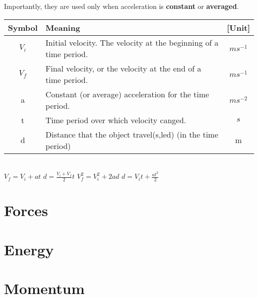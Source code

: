 \documentclass[11pt,a4paper]{article}
\begin{document}
\reversemarginpar 
{}
\normalmarginpar
Importantly, they are used only when acceleration is \textbf{constant} or \textbf{averaged}. \\

\noindent
\begin{tabular}{|c l c|}
	\toprule
\textbf{Symbol} & \textbf{Meaning} & \textbf{[Unit]} \\ \midrule
	\(V_i\) & Initial velocity. The velocity at the beginning of a time period. &\(ms^{-1}\) \\
	\(V_f\) & Final velocity, or the velocity at the end of a time period. & \(ms^{-1}\) \\ 
	a & Constant (or average) acceleration for the time period. & \(ms^{-2}\) \\
	t & Time period over which velocity canged. & \(s\) \\
	d & Distance that the object travel(s,led) (in the time period) & m \\ \bottomrule
\end{tabular}
\\

$V_f=V_i+at$
$d=\frac{V_i+V_f}{2}t$
$V_f^2=V_i^2+2ad$
$d=V_it+\frac{at^2}{2}$

\part{Forces}

\part{Energy}

\part{Momentum}
\end{document}
